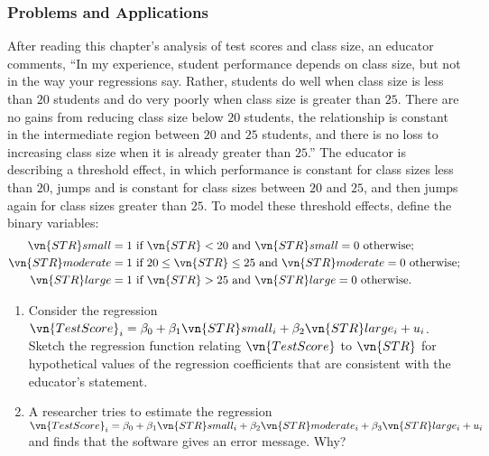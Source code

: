 

\begin{frame}[shrink=16]
\frametitle{Problems and Applications}
After reading this chapter's analysis of test scores and class size, an educator comments, ``In my experience, student performance depends on class size, but not in the way your regressions say. Rather, students do well when class size is less than $20$ students and do very poorly when class size is greater than $25$. There are no gains from reducing class size below $20$ students, the relationship is constant in the intermediate region between $20$ and $25$ students, and there is no loss to increasing class size when it is already greater than $25$.'' The educator is describing a threshold effect, in which performance is constant for class sizes less than $20$, jumps and is constant for class sizes between $20$ and $25$, and then jumps again for class sizes greater than $25$. To model these threshold effects, define the binary variables:
\begin{align*}
   \vn{STR}small & = 1 ~\text{if}~ \vn{STR} < 20 ~\text{and}~ \vn{STR}small = 0 ~\text{otherwise};\\
\vn{STR}moderate & = 1 ~\text{if}~ 20 \leq \vn{STR} \leq 25 ~\text{and}~ \vn{STR}moderate = 0 ~\text{otherwise};\\
   \vn{STR}large & = 1 ~\text{if}~ \vn{STR} > 25 ~\text{and}~ \vn{STR}large = 0 ~\text{otherwise}.
\end{align*}\vspace*{-3ex}
\begin{enumerate}
\item Consider the regression $\vn{TestScore}_{i}=\beta_{0}+\beta_{1}\vn{STR}small_{i}+\beta_{2}\vn{STR}large_{i}+u_{i}$. Sketch the regression function relating $\vn{TestScore}$ to $\vn{STR}$ for hypothetical values of the regression coefficients that are consistent with the educator's statement.
\item A researcher tries to estimate the regression $\vn{TestScore}_{i}=\beta_{0}+\beta_{1}\vn{STR}small_{i}+\beta_{2}\vn{STR}moderate_{i}+\beta_{3}\vn{STR}large_{i}+u_{i}$ and finds that the software gives an error message. Why?
\end{enumerate}
\end{frame}

